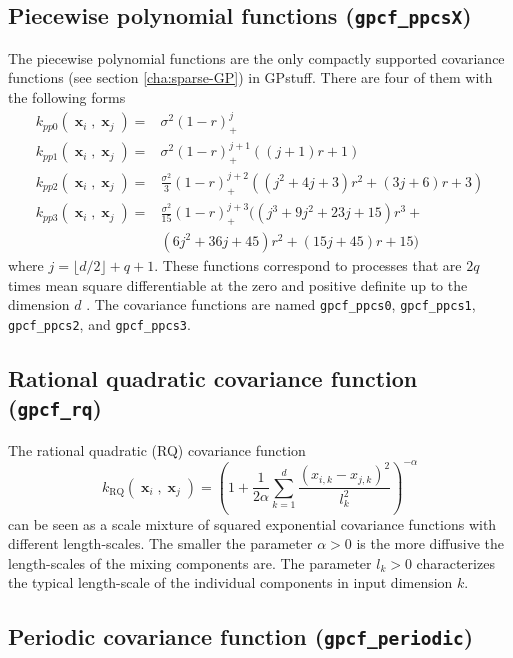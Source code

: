 \documentclass[twoside,11pt]{article}
\DeclareMathOperator{\x}{\mathbf{x}}
\newcommand{\code}[1]{{\normalfont\texttt{#1}}}
\begin{document}
\subsection*{Piecewise polynomial functions (\code{gpcf\_ppcsX})}

The piecewise polynomial functions are the only compactly supported
covariance functions (see section \ref{cha:sparse-GP}) in
GPstuff.  There are four of them with the following forms
%
\begin{align}
k_{pp0}(\x_i,\x_j) =& \sigma^2(1-r)_+^{j} \\
k_{pp1}(\x_i,\x_j) =& \sigma^2(1-r)_+^{j+1} \left( (j+1)r + 1 \right) \\
k_{pp2}(\x_i,\x_j) =& \frac{\sigma^2}{3}(1-r)_+^{j+2}((j^2+4j+3)r^2+(3j+6)r+3) \\
k_{pp3}(\x_i,\x_j) =& \frac{\sigma^2}{15}(1-r)_+^{j+3} ( (j^3 + 9j^2 +23j + 15)r^3 +\nonumber\\
&(6j^2 + 36j + 45)r^2 + (15j+45)r + 15 )
\end{align}
%
where $j = \lfloor d/2 \rfloor + q + 1$. These functions correspond to
processes that are $2q$ times mean square differentiable at the zero
and positive definite up to the dimension $d$ \citep{Wendland:2005}.
The covariance functions are named \code{gpcf\_ppcs0},
\code{gpcf\_ppcs1}, \code{gpcf\_ppcs2}, and \code{gpcf\_ppcs3}.

\subsection*{Rational quadratic covariance function (\code{gpcf\_rq})}

The rational quadratic (RQ) covariance function \citep{Rasmussen+Williams:2006}
%
\begin{equation}
k_{\text{RQ}}(\x_i,\x_j) = \left(1+\frac{1}{2 \alpha} \sum_{k=1}^d
  \frac{(x_{i,k}-x_{j,k})^2}{l_k^2} \right)^{-\alpha}
%
\end{equation}
%
can be seen as a scale mixture of squared exponential covariance
functions with different length-scales. The smaller the parameter
$\alpha > 0$ is the more diffusive the length-scales of the mixing
components are. The parameter $l_k > 0$ characterizes the typical
length-scale of the individual components in input dimension $k$.

\subsection*{Periodic covariance function (\code{gpcf\_periodic})}
\end{document}
